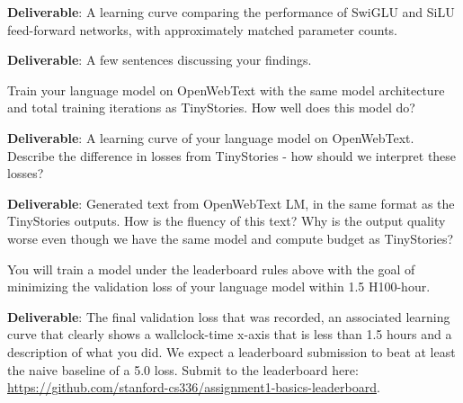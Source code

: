 
\textbf{Deliverable}: A learning curve comparing the performance of SwiGLU and SiLU feed-forward networks, with approximately matched parameter counts.

\textbf{Deliverable}: A few sentences discussing your findings.

\begin{answer}

\end{answer}


Train your language model on OpenWebText with the same model architecture and total training iterations as TinyStories. How well does this model do?

\textbf{Deliverable}: A learning curve of your language model on OpenWebText. Describe the difference in losses from TinyStories - how should we interpret these losses?

\textbf{Deliverable}: Generated text from OpenWebText LM, in the same format as the TinyStories outputs. How is the fluency of this text? Why is the output quality worse even though we have the same model and compute budget as TinyStories?

\begin{answer}

\end{answer}


You will train a model under the leaderboard rules above with the goal of minimizing the validation loss of your language model within 1.5 H100-hour.

\textbf{Deliverable}: The final validation loss that was recorded, an associated learning curve that clearly shows a wallclock-time x-axis that is less than 1.5 hours and a description of what you did. We expect a leaderboard submission to beat at least the naive baseline of a 5.0 loss. Submit to the leaderboard here: \url{https://github.com/stanford-cs336/assignment1-basics-leaderboard}.

\begin{answer}

\end{answer}

